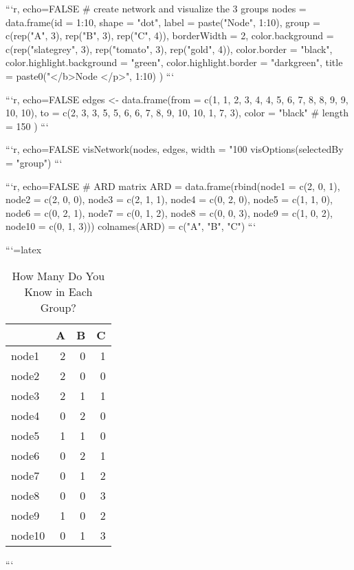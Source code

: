 ```{r, echo=FALSE}
# create network and visualize the 3 groups
nodes = data.frame(id = 1:10,
                   shape = "dot",
                   label = paste("Node", 1:10),
                   group = c(rep("A", 3), 
                             rep("B", 3), 
                             rep("C", 4)),
                   borderWidth = 2,
                   color.background = c(rep("slategrey", 3), 
                                        rep("tomato", 3), 
                                        rep("gold", 4)),
                   color.border = "black",
                   color.highlight.background = "green", 
                   color.highlight.border = "darkgreen",
                   title = paste0("</b>Node </p>", 1:10)
                   )
```

```{r, echo=FALSE}
edges <- data.frame(from = c(1, 1, 2, 3, 4, 4, 5, 6, 7, 8, 8, 9, 9, 10, 10), 
                    to =   c(2, 3, 3, 5, 5, 6, 6, 7, 8, 9, 10, 10, 1, 7, 3),
                    color = "black"
                    # length = 150
                    )
```

```{r, echo=FALSE}
visNetwork(nodes, edges, width = "100%
  visOptions(selectedBy = "group")
```

```{r, echo=FALSE}
# ARD matrix
ARD = data.frame(rbind(node1 = c(2, 0, 1),
                       node2 = c(2, 0, 0),
                       node3 = c(2, 1, 1),
                       node4 = c(0, 2, 0),
                       node5 = c(1, 1, 0),
                       node6 = c(0, 2, 1),
                       node7 = c(0, 1, 2),
                       node8 = c(0, 0, 3),
                       node9 = c(1, 0, 2),
                       node10 = c(0, 1, 3)))
colnames(ARD) = c("A", "B", "C")
```



```{=latex}
\begin{table}

\caption{How Many Do You Know in Each Group?}
\centering
\begin{tabular}[t]{l|r|r|r}
\hline
  & A & B & C\\
\hline
node1 & 2 & 0 & 1\\
\hline
node2 & 2 & 0 & 0\\
\hline
node3 & 2 & 1 & 1\\
\hline
node4 & 0 & 2 & 0\\
\hline
node5 & 1 & 1 & 0\\
\hline
node6 & 0 & 2 & 1\\
\hline
node7 & 0 & 1 & 2\\
\hline
node8 & 0 & 0 & 3\\
\hline
node9 & 1 & 0 & 2\\
\hline
node10 & 0 & 1 & 3\\
\hline
\end{tabular}
\end{table}
```



